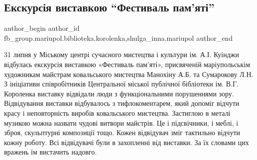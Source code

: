  
 
 
 
 

\subsection{Екскурсія виставкою  \enquote{Фестиваль пам'яті}}
\label{sec:31_07_2021.fb.fb_group.mariupol.biblioteka.korolenka.1.yekskurs_ya_vistavko}
 
\ifcmt
 author_begin
   author_id fb_group.mariupol.biblioteka.korolenka,shulga_inna.mariupol
 author_end
\fi

31 липня у Міському центрі сучасного мистецтва і культури ім. А.І. Куінджи
відбулась екскурсія виставкою  «Фестиваль пам'яті», присвяченій маріупольськім
художникам майстрам ковальського мистецтва Манохіну А.Б. та Сумарокову Л.Н. З
ініціативи співробітників Центральної міської публічної бібліотеки ім. В.Г.
Короленка виставку відвідали люди з функціональними порушеннями зору.
Відвідування виставки відбувалось з тифлокоментарем, який допоміг відчути красу
і неповторність виробів ковальського мистецтва. Застиглою в металі музикою
можна назвати чудові витвори майстрів. Це і підсвічники, і меблі, і зброя,
скульптурні композиції тощо. Кожен відвідувач зміг тактильно відчути кожну
роботу. Всі відвідувачі були в захопленні від виставки. За їх словами цих
вражень їм вистачить надовго.
